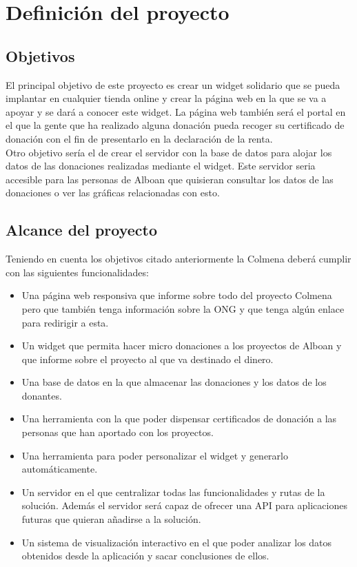 \section{Definición del proyecto}

\subsection{Objetivos}
El principal objetivo de este proyecto es crear un widget solidario que se pueda implantar en cualquier tienda online y crear la página web en la que se va a apoyar y se dará a conocer este widget. La página web también será el portal en el que la gente que ha realizado alguna donación pueda recoger su certificado de donación con el fin de presentarlo en la declaración de la renta.\\

Otro objetivo sería el de crear el servidor con la base de datos para alojar los datos de las donaciones realizadas mediante el widget. Este servidor seria accesible para las personas de Alboan que quisieran consultar los datos de las donaciones o ver las gráficas relacionadas con esto.

\subsection{Alcance del proyecto}
Teniendo en cuenta los objetivos citado anteriormente la Colmena deberá cumplir con las siguientes funcionalidades:

\begin{itemize}
	\item Una página web responsiva que informe sobre todo del proyecto Colmena pero que también tenga información sobre la ONG y que tenga algún enlace para redirigir a esta.
	\item Un widget que permita hacer micro donaciones a los proyectos de Alboan y que informe sobre el proyecto al que va destinado el dinero.
	\item Una base de datos en la que almacenar las donaciones y los datos de los donantes.
	\item Una herramienta con la que poder dispensar certificados de donación a las personas que han aportado con los proyectos.
	\item Una herramienta para poder personalizar el widget y generarlo automáticamente.
	\item Un servidor en el que centralizar todas las funcionalidades y rutas de la solución. Además el servidor será capaz de ofrecer una API para aplicaciones futuras que quieran añadirse a la solución.
	\item Un sistema de visualización interactivo en el que poder analizar los datos obtenidos desde la aplicación y sacar conclusiones de ellos.
\end{itemize}

